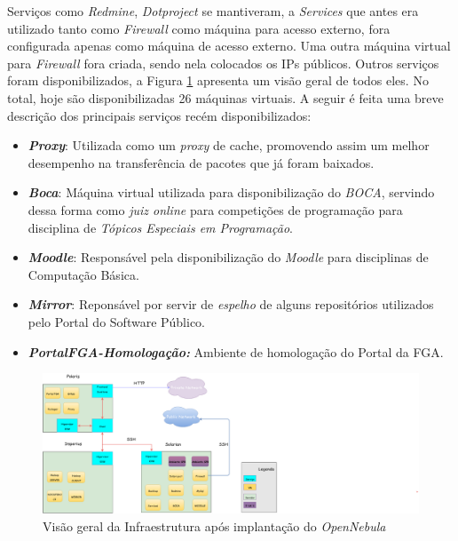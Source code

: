 \begin{apendicesenv}
Serviços como \textit{Redmine}, \textit{Dotproject} se mantiveram, a \textit{Services} que antes era utilizado tanto como \textit{Firewall} como máquina para acesso externo, fora configurada apenas como máquina de acesso externo. Uma outra máquina virtual para \textit{Firewall} fora criada, sendo nela colocados os IPs públicos. Outros serviços foram disponibilizados, a Figura \ref{fig:vm_infra} apresenta um visão geral de todos eles. No total, hoje são disponibilizadas 26 máquinas virtuais. A seguir é feita uma breve descrição dos principais serviços recém disponibilizados:

\begin{itemize}
\item \textbf{\textit{Proxy}}: Utilizada como um \textit{proxy} de cache, promovendo assim um melhor desempenho na transferência de pacotes que já foram baixados.
\item \textbf{\textit{Boca}}: Máquina virtual utilizada para disponibilização do \textit{BOCA}, servindo dessa forma como \textit{juiz online} para competições de programação para disciplina de \textit{Tópicos Especiais em Programação}.
\item \textbf{\textit{Moodle}}: Responsável pela disponibilização do \textit{Moodle} para disciplinas de Computação Básica.
\item \textbf{\textit{Mirror}}: Reponsável por servir de \textit{espelho} de alguns repositórios utilizados pelo Portal do Software Público.
\item \textbf{\textit{PortalFGA-Homologação:}} Ambiente de homologação do Portal da FGA.

\end{itemize}


\begin{figure}[!h]
\centering
\includegraphics [keepaspectratio=true,scale=0.4]{figuras/vm_infra.eps}
\caption{Visão geral da Infraestrutura após implantação do \textit{OpenNebula}}
\label{fig:vm_infra}
\end{figure}


\end{apendicesenv}
